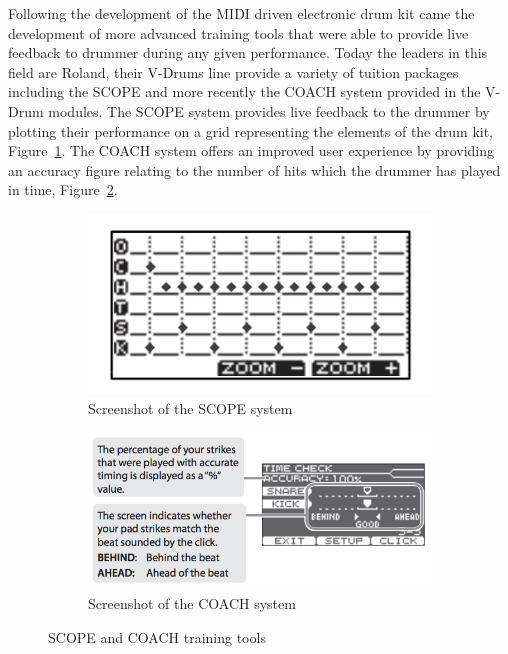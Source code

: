 \documentclass[a4paper, 11pt]{article}
\begin{document}
Following the development of the MIDI driven electronic drum kit came the development of more advanced training tools that were able to provide live feedback to drummer during any given performance. Today the leaders in this field are Roland, their V-Drums line provide a variety of tuition packages including the SCOPE and more recently the COACH system provided in the V-Drum modules. The SCOPE system provides live feedback to the drummer by plotting their performance on a grid representing the elements of the drum kit, Figure~\ref{fig: scope}. The COACH system offers an improved user experience by providing an accuracy figure relating to the number of hits which the drummer has played in time, Figure~\ref{fig: coach}.
\begin{figure}[ht]
\centering
\begin{subfigure}{.5\textwidth}
  \centering
  \includegraphics[width=0.5\linewidth]{images/Scope.jpg}
  \caption{Screenshot of the SCOPE system}
  \label{fig: scope}
\end{subfigure}%
\begin{subfigure}{.5\textwidth}
  \centering
  \includegraphics[width=0.75\linewidth]{images/coach.jpg}
  \caption{Screenshot of the COACH system}
  \label{fig: coach}
\end{subfigure}
\caption{SCOPE and COACH training tools}
\label{fig: systems}
\end{figure}
\end{document}
